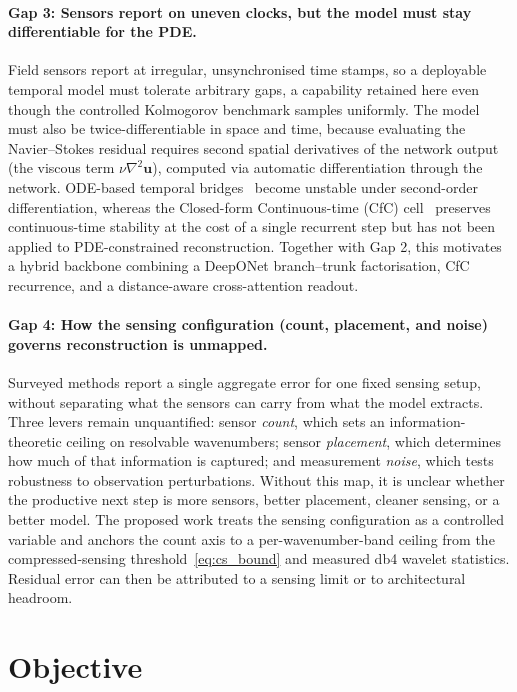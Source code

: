 \paragraph{Gap 3: Sensors report on uneven clocks, but the model must stay differentiable for the PDE.}
Field sensors report at irregular, unsynchronised time stamps, so a deployable temporal model must tolerate arbitrary gaps, a capability retained here even though the controlled Kolmogorov benchmark samples uniformly. The model must also be twice-differentiable in space and time, because evaluating the Navier--Stokes residual requires second spatial derivatives of the network output (the viscous term $\nu\nabla^2\mathbf{u}$), computed via automatic differentiation through the network. ODE-based temporal bridges~\cite{Chen2018NODE,Rubanova2019LatentODE} become unstable under second-order differentiation, whereas the Closed-form Continuous-time (CfC) cell~\cite{Hasani2022CfC} preserves continuous-time stability at the cost of a single recurrent step but has not been applied to PDE-constrained reconstruction. Together with Gap 2, this motivates a hybrid backbone combining a DeepONet branch--trunk factorisation, CfC recurrence, and a distance-aware cross-attention readout.

\paragraph{Gap 4: How the sensing configuration (count, placement, and noise) governs reconstruction is unmapped.}
Surveyed methods report a single aggregate error for one fixed sensing setup, without separating what the sensors can carry from what the model extracts. Three levers remain unquantified: sensor \emph{count}, which sets an information-theoretic ceiling on resolvable wavenumbers; sensor \emph{placement}, which determines how much of that information is captured; and measurement \emph{noise}, which tests robustness to observation perturbations. Without this map, it is unclear whether the productive next step is more sensors, better placement, cleaner sensing, or a better model. The proposed work treats the sensing configuration as a controlled variable and anchors the count axis to a per-wavenumber-band ceiling from the compressed-sensing threshold~\eqref{eq:cs_bound} and measured db4 wavelet statistics. Residual error can then be attributed to a sensing limit or to architectural headroom.

\section{Objective}
\label{sec:research_questions}

